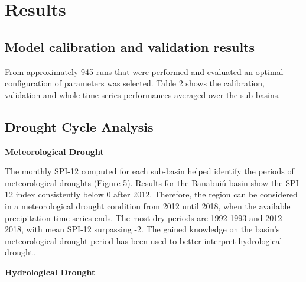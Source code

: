 \documentclass[draft]{agujournal2019}
\begin{document}
\section{Results}
\subsection{Model calibration and validation results}
From approximately 945 runs that were performed and evaluated an optimal configuration of parameters was selected. Table 2 shows the calibration, validation and whole time series performances averaged over the sub-basins.

\subsection{Drought Cycle Analysis}
\textbf{Meteorological Drought}

The monthly SPI-12 computed for each sub-basin helped identify the periods of meteorological droughts (Figure 5). Results for the Banabuiú basin show the SPI-12 index consistently below 0 after 2012. Therefore, the region can be considered in a meteorological drought condition from 2012 until 2018, when the available precipitation time series ends. The most dry periods are 1992-1993 and 2012-2018, with mean SPI-12 surpassing -2. The gained knowledge on the basin’s meteorological drought period has been used to better interpret hydrological drought.

\textbf{Hydrological Drought}
\end{document}
